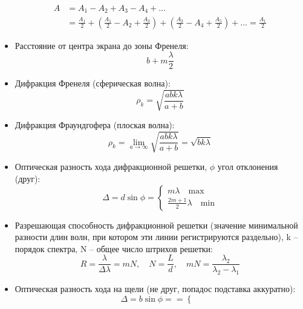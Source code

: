 \documentclass[twoside, a4paperpt, fleqn]{extarticle}
\begin{document}
\begin{multicols}{2}
\begin{itemize}
\begin{align*}
                A &= A_1 - A_2 + A_3 - A_4 + \dots \\ &= \frac{A_1}{2} + \left(\frac{A_1}{2} - A_2 + \frac{A_3}{2}\right) + \left(\frac{A_3}{2} - A_4 + \frac{A_5}{2}\right) + \dots = \frac{A_1}{2}
            \end{align*}
            \item Расстояние от центра экрана до зоны Френеля:
            \begin{equation*}
                b + m \frac{\lambda}{2}
            \end{equation*}
            \item Дифракция Френеля (сферическая волна):
            \begin{equation*}
                \rho_k = \sqrt{\frac{a b k \lambda}{a + b}}
            \end{equation*}
            \item Дифракция Фраундгофера (плоская волна):
            \begin{equation*}
                \rho_k = \lim_{a \to \infty} \sqrt{\frac{a b k \lambda}{a + b}} = \sqrt{b k  \lambda}
            \end{equation*}
            \item Оптическая разность хода дифракционной решетки, $\phi$ угол отклонения (друг):
            \begin{equation*}
                \Delta = d \sin \phi = \begin{cases}
                    m \lambda  \quad \text{max} \\
                    \frac{2 m + 1}{2} \lambda \quad \text{min}
                \end{cases}
            \end{equation*}
            \item Разрешающая способность дифракционной решетки (значение минимальной разности длин волн, при котором эти линии регистрируются раздельно), k – порядок спектра, N – общее число 
            штрихов решетки:
            \begin{equation*}
                R = \frac{\lambda}{\Delta \lambda} = m N, \quad N = \frac{L}{d}, \quad mN = \frac{\lambda_2}{\lambda_2 - \lambda_1}
            \end{equation*}
            \item Оптическая разность  хода на щели (не друг, попадос подставка аккуратно):
            \begin{equation*}
                \Delta = b \sin \phi =  = \begin{cases}

\end{cases}
\end{equation*}
\end{itemize}
\end{multicols}
\end{document}
